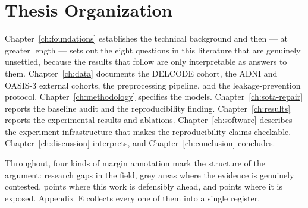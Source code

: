 \section{Thesis Organization}
\label{sec:organisation}

Chapter~\ref{ch:foundations} establishes the technical background and then --- at greater
length --- sets out the eight questions in this literature that are genuinely unsettled,
because the results that follow are only interpretable as answers to them.
Chapter~\ref{ch:data} documents the DELCODE cohort, the ADNI and OASIS-3 external cohorts,
the preprocessing pipeline, and the leakage-prevention protocol.
Chapter~\ref{ch:methodology} specifies the models. Chapter~\ref{ch:sota-repair} reports the
baseline audit and the reproducibility finding. Chapter~\ref{ch:results} reports the
experimental results and ablations. Chapter~\ref{ch:software} describes the experiment
infrastructure that makes the reproducibility claims checkable.
Chapter~\ref{ch:discussion} interprets, and Chapter~\ref{ch:conclusion} concludes.

Throughout, four kinds of margin annotation mark the structure of the argument: research
gaps in the field, grey areas where the evidence is genuinely contested, points where this
work is defensibly ahead, and points where it is exposed. Appendix~E collects every one of
them into a single register.
